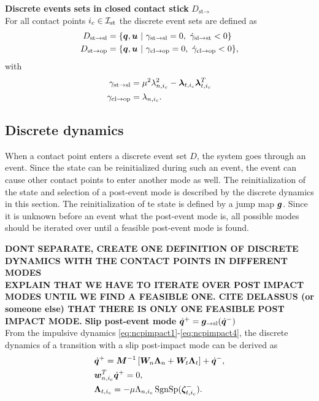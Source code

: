 \documentclass[../DC2017114Bouma.tex]{subfiles}
\begin{document}
\textbf{Discrete events sets in closed contact stick} $D_{\text{st}\rightarrow}$\\
For all contact points $i_c\in\mathcal{I}_{\text{st}}$ the discrete event sets are defined as
\begin{align}
D_{\text{st}\rightarrow\text{sl}} &= \{ \qb,\ub\ |\ \gamma_{\text{st}\rightarrow\text{sl}} = 0,\ \dot{\gamma}_{\text{sl}\rightarrow\text{st}} < 0\}\\
D_{\text{st}\rightarrow\text{op}} &= \{ \qb,\ub\ |\ \gamma_{\text{cl}\rightarrow\text{op}} = 0,\ \dot{\gamma}_{\text{cl}\rightarrow\text{op}} < 0\},
\end{align}
with 
\begin{align}
\gamma_{\text{st}\rightarrow\text{sl}} &= \mu^2\lambda_{n,i_c}^2-\boldsymbol{\lambda}_{t,i_c}\boldsymbol{\lambda}_{t,i_c}^T\\
\gamma_{\text{cl}\rightarrow\text{op}} &= \lambda_{n,i_c}.
\end{align}

\subsection{Discrete dynamics}\label{sec:2discdyn}
When a contact point enters a discrete event set $D$, the system goes through an event. Since the state can be reinitialized during such an event, the event can cause other contact points to enter another mode as well. The reinitialization of the state and selection of a post-event mode is described by the discrete dynamics in this section. The reinitialization of te state is defined by a jump map ${\boldsymbol{g}}$. Since it is unknown before an event what the post-event mode is, all possible modes should be iterated over until a feasible post-event mode is found.

\textbf{DONT SEPARATE, CREATE ONE DEFINITION OF DISCRETE DYNAMICS WITH THE CONTACT POINTS IN DIFFERENT MODES}\\
\textbf{EXPLAIN THAT WE HAVE TO ITERATE OVER POST IMPACT MODES UNTIL WE FIND A FEASIBLE ONE. CITE DELASSUS (or someone else) THAT THERE IS ONLY ONE FEASIBLE POST IMPACT MODE.}
\textbf{Slip post-event mode} $\dot{{\boldsymbol{q}}}^+ = {\boldsymbol{g}}_{\rightarrow\text{sl}}(\dot{{\boldsymbol{q}}}^-)$\\
From the impulsive dynamics \eqref{eq:ncpimpact1}-\eqref{eq:ncpimpact4}, the discrete dynamics of a transition with a slip post-impact mode can be derived as
\begin{align}
&\dot{{\boldsymbol{q}}}^+ = {\boldsymbol{M}}^{-1}\left[{\boldsymbol{W}}_{n}\boldsymbol{\Lambda}_{n} + {\boldsymbol{W}}_{t}\boldsymbol{\Lambda}_{t}\right] + \dot{{\boldsymbol{q}}}^-,\label{eq:discslip1}\\
&{\boldsymbol{w}}^T_{n,i_c}\dot{{\boldsymbol{q}}}^+ = 0,\label{eq:discslip2}\\
&\boldsymbol{\Lambda}_{t,i_c} = -\mu\Lambda_{n,i_c}\operatorname{\text{SgnSp}}(\boldsymbol{\zeta}^-_{t,i_c}).\label{eq:discslip3}
\end{align}
\end{document}
